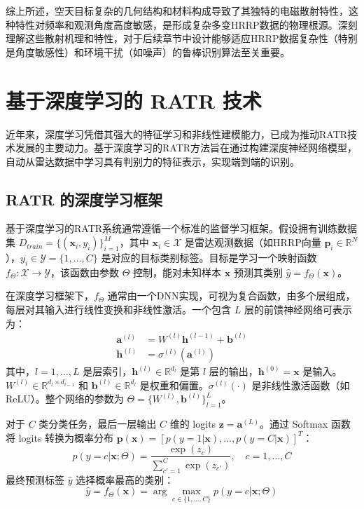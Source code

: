 综上所述，空天目标复杂的几何结构和材料构成导致了其独特的电磁散射特性，这种特性对频率和观测角度高度敏感，是形成复杂多变HRRP数据的物理根源。深刻理解这些散射机理和特性，对于后续章节中设计能够适应HRRP数据复杂性（特别是角度敏感性）和环境干扰（如噪声）的鲁棒识别算法至关重要。

\section{基于深度学习的 RATR 技术}
\label{sec:深度学习_ratr}

近年来，深度学习凭借其强大的特征学习和非线性建模能力，已成为推动RATR技术发展的主要动力。基于深度学习的RATR方法旨在通过构建深度神经网络模型，自动从雷达数据中学习具有判别力的特征表示，实现端到端的识别。

\subsection{RATR 的深度学习框架}
\label{subsec:深度学习_framework}

基于深度学习的RATR系统通常遵循一个标准的监督学习框架。假设拥有训练数据集 $D_{train} = \{(\mathbf{x}_i, y_i)\}_{i=1}^{M}$，其中 $\mathbf{x}_i \in \mathcal{X}$ 是雷达观测数据（如HRRP向量 $\mathbf{p}_i \in \mathbb{R}^N$），$y_i \in \mathcal{Y} = \{1, \dots, C\}$ 是对应的目标类别标签。目标是学习一个映射函数 $f_\Theta: \mathcal{X} \rightarrow \mathcal{Y}$，该函数由参数 $\Theta$ 控制，能对未知样本 $\mathbf{x}$ 预测其类别 $\hat{y} = f_\Theta(\mathbf{x})$。

在深度学习框架下，$f_\Theta$ 通常由一个DNN实现，可视为复合函数，由多个层组成，每层对其输入进行线性变换和非线性激活。一个包含 $L$ 层的前馈神经网络可表示为：
\begin{align}
    \mathbf{a}^{(l)} &= W^{(l)} \mathbf{h}^{(l-1)} + \mathbf{b}^{(l)} \label{eq:dnn_linear} \\
    \mathbf{h}^{(l)} &= \sigma^{(l)}(\mathbf{a}^{(l)}) \label{eq:dnn_activation}
\end{align}
其中，$l=1, \dots, L$ 是层索引，$\mathbf{h}^{(l)} \in \mathbb{R}^{d_l}$ 是第 $l$ 层的输出，$\mathbf{h}^{(0)} = \mathbf{x}$ 是输入。$W^{(l)} \in \mathbb{R}^{d_l \times d_{l-1}}$ 和 $\mathbf{b}^{(l)} \in \mathbb{R}^{d_l}$ 是权重和偏置。$\sigma^{(l)}(\cdot)$ 是非线性激活函数（如ReLU）。整个网络的参数为 $\Theta = \{W^{(l)}, \mathbf{b}^{(l)}\}_{l=1}^{L}$。

对于 $C$ 类分类任务，最后一层输出 $C$ 维的 logits $\mathbf{z} = \mathbf{a}^{(L)}$。通过 Softmax 函数将 logits 转换为概率分布 $\mathbf{p}(\mathbf{x}) = [p(y=1|\mathbf{x}), \dots, p(y=C|\mathbf{x})]^T$：
\begin{equation}
    p(y=c|\mathbf{x}; \Theta) = \frac{\exp(z_c)}{\sum_{c'=1}^{C} \exp(z_{c'})}, \quad c=1, \dots, C
    \label{eq:softmax}
\end{equation}
最终预测标签 $\hat{y}$ 选择概率最高的类别：
\begin{equation}
    \hat{y} = f_\Theta(\mathbf{x}) = \arg\max_{c \in \{1, \dots, C\}} p(y=c|\mathbf{x}; \Theta)
    \label{eq:prediction}
\end{equation}

